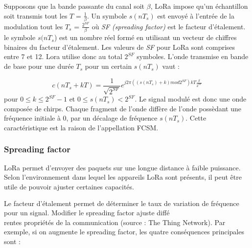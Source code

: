 \vspace{0.1cm}

Supposons que la bande passante du canal soit $\beta$, LoRa impose qu'un échantillon soit transmis tout les $T$ = $\frac{1}{\beta}$. Un symbole $s(nT_s)$ est envoyé à l'entrée de la modulation tout les $T_s$ = $\frac{2^{SF}}{\beta}$ où \textit{SF (spreading factor)} est le facteur d'étalement. le symbole $s(nT_s$) est un nombre réel formé en utilisant un vecteur de chiffres binaires du facteur d'étalement. Les valeurs de \textit{SF} pour LoRa sont comprises entre 7 et 12. Lora utilise donc au total $2^{SF}$ symboles. L'onde transmise en bande de base pour une durée $T_s$ pour un certain $s(nT_s)$ vaut :

\begin{equation}
c(nT_s + kT) = \frac{1}{\sqrt{2^{SF}}} e^{j2\pi ((s(nT_s) +k )mod 2^{SF})kT \frac{\beta}{2^{SF}}}
\end{equation}
pour $0 \leq k \leq 2^{SF}-1$ et $0 \leq s(nT_s) < 2^{SF}$.
Le signal modulé est donc une onde composée de chirps. Chaque fragment de l'onde diffère de l'onde possèdant une fréquence initiale à 0, par un décalage de fréquence $s(nT_s)$. Cette caractéristique est la raison de l'appellation FCSM.


\subsubsection{Spreading factor}

LoRa permet d'envoyer des paquets sur une longue distance à faible puissance. Selon l'environnement dans lequel les appareils LoRa sont présents, il peut être utile de pouvoir ajuster certaines capacités.

\vspace{0.1cm}

Le facteur d'étalement permet de déterminer le taux de variation de fréquence pour un signal. Modifier le spreading factor ajuste diffé \\ rentes propriétés de la communication (source : The Thing Network\cite{thethingsnetworkSF}). Par exemple, si on augmente le spreading factor, les quatre conséquences principales sont :

\vspace{0.1cm}

